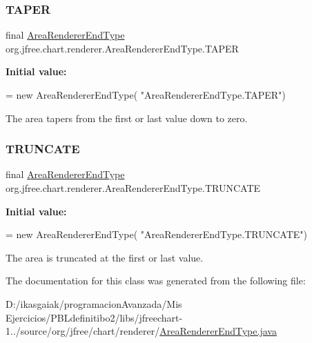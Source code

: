 \subsubsection{\texorpdfstring{T\+A\+P\+ER}{TAPER}}
{\footnotesize\ttfamily final \mbox{\hyperlink{classorg_1_1jfree_1_1chart_1_1renderer_1_1_area_renderer_end_type}{Area\+Renderer\+End\+Type}} org.\+jfree.\+chart.\+renderer.\+Area\+Renderer\+End\+Type.\+T\+A\+P\+ER\hspace{0.3cm}{\ttfamily [static]}}

{\bfseries Initial value\+:}
\begin{DoxyCode}
= \textcolor{keyword}{new} AreaRendererEndType(
            \textcolor{stringliteral}{"AreaRendererEndType.TAPER"})
\end{DoxyCode}
The area tapers from the first or last value down to zero. \mbox{\label{classorg_1_1jfree_1_1chart_1_1renderer_1_1_area_renderer_end_type_a671cf856a58d0bf1734191fde4c8fffb}} 
\subsubsection{\texorpdfstring{T\+R\+U\+N\+C\+A\+TE}{TRUNCATE}}
{\footnotesize\ttfamily final \mbox{\hyperlink{classorg_1_1jfree_1_1chart_1_1renderer_1_1_area_renderer_end_type}{Area\+Renderer\+End\+Type}} org.\+jfree.\+chart.\+renderer.\+Area\+Renderer\+End\+Type.\+T\+R\+U\+N\+C\+A\+TE\hspace{0.3cm}{\ttfamily [static]}}

{\bfseries Initial value\+:}
\begin{DoxyCode}
= \textcolor{keyword}{new} AreaRendererEndType(
            \textcolor{stringliteral}{"AreaRendererEndType.TRUNCATE"})
\end{DoxyCode}
The area is truncated at the first or last value. 

The documentation for this class was generated from the following file\+:\begin{DoxyCompactItemize}
\item 
D\+:/ikasgaiak/programacion\+Avanzada/\+Mis Ejercicios/\+P\+B\+Ldefinitibo2/libs/jfreechart-\/1../source/org/jfree/chart/renderer/\mbox{\hyperlink{_area_renderer_end_type_8java}{Area\+Renderer\+End\+Type.\+java}}\end{DoxyCompactItemize}
